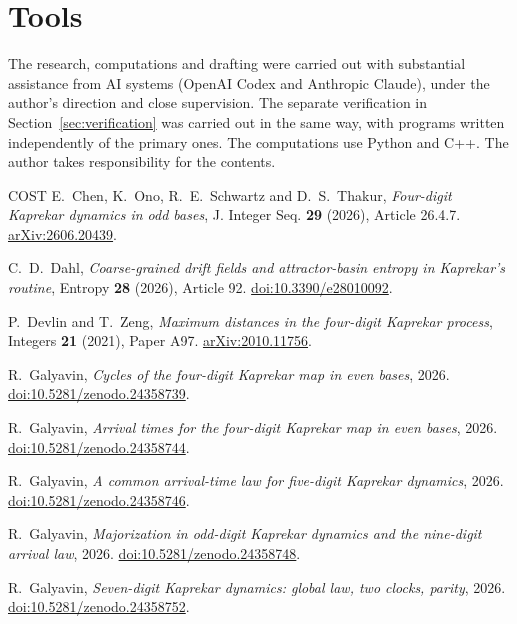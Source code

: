 \documentclass[11pt,reqno]{amsart}
\theoremstyle{remark}
\begin{document}
\section*{Tools}
The research, computations and drafting were carried out with substantial
assistance from AI systems (OpenAI Codex and Anthropic Claude), under the
author's direction and close supervision. The separate verification in
Section~\ref{sec:verification} was carried out in the same way, with programs
written independently of the primary ones. The computations use Python and
C++. The author takes responsibility for the contents.

\begingroup
\raggedright
\begin{thebibliography}{COST}
E.~Chen, K.~Ono, R.~E.~Schwartz and D.~S.~Thakur,
\emph{Four-digit Kaprekar dynamics in odd bases},
J. Integer Seq. \textbf{29} (2026), Article 26.4.7.
\href{https://arxiv.org/abs/2606.20439}{arXiv:2606.20439}.

C.~D.~Dahl, \emph{Coarse-grained drift fields and attractor-basin entropy
in Kaprekar's routine}, Entropy \textbf{28} (2026), Article 92.
\href{https://doi.org/10.3390/e28010092}{doi:10.3390/e28010092}.

P.~Devlin and T.~Zeng, \emph{Maximum distances in the four-digit
Kaprekar process}, Integers \textbf{21} (2021), Paper A97.
\href{https://arxiv.org/abs/2010.11756}{arXiv:2010.11756}.

R.~Galyavin, \emph{Cycles of the four-digit Kaprekar map in even bases}, 2026.
\href{https://doi.org/10.5281/zenodo.24358739}{doi:10.5281/zenodo.24358739}.

R.~Galyavin, \emph{Arrival times for the four-digit Kaprekar map in even bases}, 2026.
\href{https://doi.org/10.5281/zenodo.24358744}{doi:10.5281/zenodo.24358744}.

R.~Galyavin, \emph{A common arrival-time law for five-digit Kaprekar dynamics}, 2026.
\href{https://doi.org/10.5281/zenodo.24358746}{doi:10.5281/zenodo.24358746}.

R.~Galyavin, \emph{Majorization in odd-digit Kaprekar dynamics and the nine-digit arrival law}, 2026.
\href{https://doi.org/10.5281/zenodo.24358748}{doi:10.5281/zenodo.24358748}.

R.~Galyavin, \emph{Seven-digit Kaprekar dynamics: global law, two clocks, parity}, 2026.
\href{https://doi.org/10.5281/zenodo.24358752}{doi:10.5281/zenodo.24358752}.


\end{thebibliography}
\end{document}
